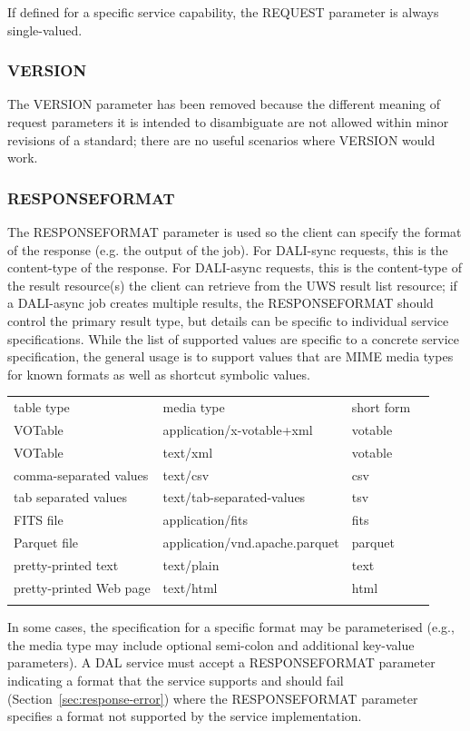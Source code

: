 \documentclass[11pt,letter]{ivoa}
\begin{document}
If defined for a specific service capability, the REQUEST parameter is always
single-valued.

\subsubsection{VERSION}
\label{sec:VERSION}
The VERSION parameter has been removed because the different
meaning of request
parameters it is intended to disambiguate are not allowed within minor
revisions of a standard; there are no useful scenarios where VERSION would work.

\subsubsection{RESPONSEFORMAT}
\label{sec:RESPONSEFORMAT}
The RESPONSEFORMAT parameter is used so the client can specify the format of the
response (e.g. the output of the job). For DALI-sync requests, this is the
content-type of the response. For DALI-async requests, this is the content-type
of the result resource(s) the client can retrieve from the UWS result list
resource; if a DALI-async job creates multiple results, the RESPONSEFORMAT
should control the primary result type, but details can be specific to
individual service specifications. While the list of supported values are
specific to a concrete service specification, the general usage is to support
values that are MIME media types \citep{std:MIME} for known
formats as well as
shortcut symbolic values.

\noindent
\begin{tabular}{l l l l}
\sptablerule
table type & media type & short form \\
\sptablerule
VOTable & application/x-votable+xml & votable \\
VOTable & text/xml & votable \\
comma-separated values & text/csv & csv \\
tab separated values & text/tab-separated-values & tsv \\
FITS file & application/fits & fits \\
Parquet file & application/vnd.apache.parquet & parquet \\
pretty-printed text & text/plain & text \\
pretty-printed Web page & text/html & html \\
\sptablerule
\label{tab:mimetypes}
\end{tabular}

In some cases, the specification for a specific format may be parameterised
(e.g., the media type may include optional semi-colon and additional key-value
parameters). A DAL service must accept a RESPONSEFORMAT parameter indicating a
format that the service supports and should  fail (Section~\ref{sec:response-error}) 
where the RESPONSEFORMAT parameter specifies a format not supported by the service
implementation.
\end{document}

